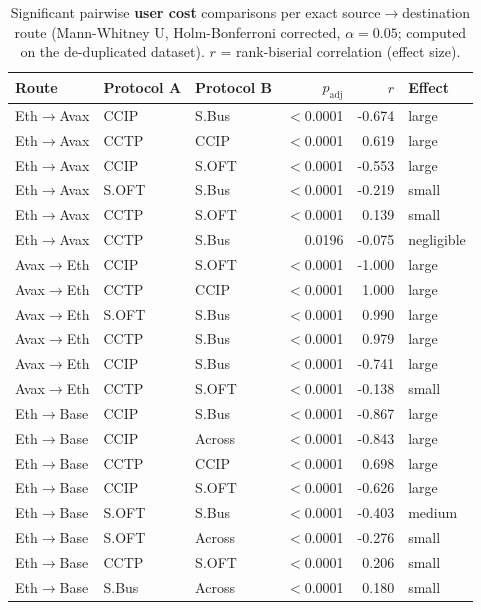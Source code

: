 \begin{table}[ht]
\caption{Significant pairwise \textbf{user cost} comparisons per exact source$\to$destination route (Mann-Whitney U, Holm-Bonferroni corrected, $\alpha=0.05$; computed on the de-duplicated dataset). $r$ = rank-biserial correlation (effect size).}
\label{table:stats_pairwise_cost}
\begingroup
\tiny
\setlength{\tabcolsep}{3pt}
\begin{tabular}{lllrrl}
\toprule
\textbf{Route} & \textbf{Protocol A} & \textbf{Protocol B} & $p_{\text{adj}}$ & $r$ & \textbf{Effect} \\
\midrule
Eth$\to$Avax & CCIP & S.Bus & $<$0.0001 & -0.674 & large \\
Eth$\to$Avax & CCTP & CCIP & $<$0.0001 & 0.619 & large \\
Eth$\to$Avax & CCIP & S.OFT & $<$0.0001 & -0.553 & large \\
Eth$\to$Avax & S.OFT & S.Bus & $<$0.0001 & -0.219 & small \\
Eth$\to$Avax & CCTP & S.OFT & $<$0.0001 & 0.139 & small \\
Eth$\to$Avax & CCTP & S.Bus & 0.0196 & -0.075 & negligible \\
\midrule
Avax$\to$Eth & CCIP & S.OFT & $<$0.0001 & -1.000 & large \\
Avax$\to$Eth & CCTP & CCIP & $<$0.0001 & 1.000 & large \\
Avax$\to$Eth & S.OFT & S.Bus & $<$0.0001 & 0.990 & large \\
Avax$\to$Eth & CCTP & S.Bus & $<$0.0001 & 0.979 & large \\
Avax$\to$Eth & CCIP & S.Bus & $<$0.0001 & -0.741 & large \\
Avax$\to$Eth & CCTP & S.OFT & $<$0.0001 & -0.138 & small \\
\midrule
Eth$\to$Base & CCIP & S.Bus & $<$0.0001 & -0.867 & large \\
Eth$\to$Base & CCIP & Across & $<$0.0001 & -0.843 & large \\
Eth$\to$Base & CCTP & CCIP & $<$0.0001 & 0.698 & large \\
Eth$\to$Base & CCIP & S.OFT & $<$0.0001 & -0.626 & large \\
Eth$\to$Base & S.OFT & S.Bus & $<$0.0001 & -0.403 & medium \\
Eth$\to$Base & S.OFT & Across & $<$0.0001 & -0.276 & small \\
Eth$\to$Base & CCTP & S.OFT & $<$0.0001 & 0.206 & small \\
Eth$\to$Base & S.Bus & Across & $<$0.0001 & 0.180 & small \\

\end{tabular}
\end{table}
